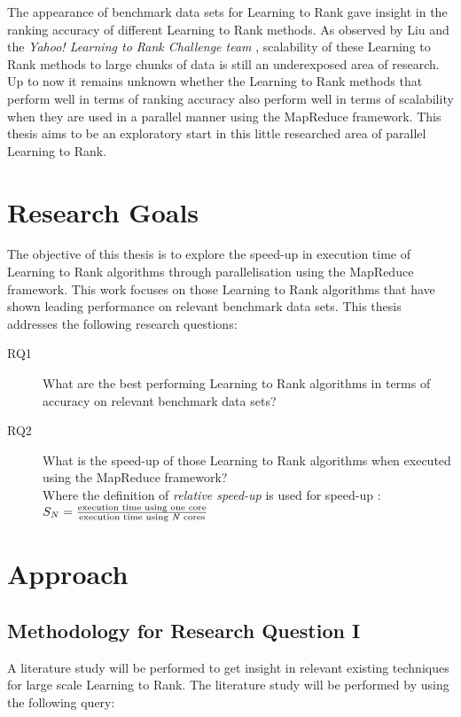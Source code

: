 The appearance of benchmark data sets for Learning to Rank gave insight in the ranking accuracy of different Learning to Rank methods. As observed by Liu \cite{Liu2007} and the \emph{Yahoo! Learning to Rank Challenge team} \cite{Chapelle2011b}, scalability of these Learning to Rank methods to large chunks of data is still an underexposed area of research. Up to now it remains unknown whether the Learning to Rank methods that perform well in terms of ranking accuracy also perform well in terms of scalability when they are used in a parallel manner using the MapReduce framework. This thesis aims to be an exploratory start in this little researched area of parallel Learning to Rank.\\

\section{Research Goals}
\label{sec:goals}
The objective of this thesis is to explore the speed-up in execution time of Learning to Rank algorithms through parallelisation using the MapReduce framework.
This work focuses on those Learning to Rank algorithms that have shown leading performance on relevant benchmark data sets.
This thesis addresses the following research questions:
\begin{description}
\item[RQ1] What are the best performing Learning to Rank algorithms in terms of accuracy on relevant benchmark data sets?\\

\item[RQ2] What is the speed-up of those Learning to Rank algorithms when executed using the MapReduce framework?\\
Where the definition of \emph{relative speed-up} is used for speed-up \cite{Sun1991}:\\

$S_N = \frac{\text{execution time using one core}}{\text{execution time using \emph{N} cores}}$
\end{description}

\section{Approach}
\subsection{Methodology for Research Question I}
A literature study will be performed to get insight in relevant existing techniques for large scale Learning to Rank. The literature study will be performed by using the following query:\\


